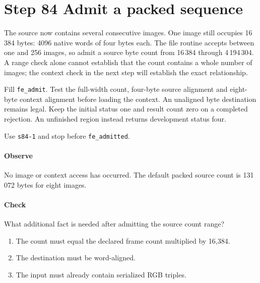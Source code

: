 \section{Step 84 Admit a packed sequence}
The source now contains several consecutive images. One image still occupies 16\,384 bytes: 4096 native words of four bytes each. The file routine accepts between one and 256 images, so admit a source byte count from 16\,384 through 4\,194\,304. A range check alone cannot establish that the count contains a whole number of images; the context check in the next step will establish the exact relationship.

Fill \texttt{fe\_admit}. Test the full-width count, four-byte source alignment and eight-byte context alignment before loading the context. An unaligned byte destination remains legal. Keep the initial status one and result count zero on a completed rejection. An unfinished region instead returns development status four.

Use \texttt{s84-1} and stop before \texttt{fe\_admitted}.

\paragraph{Observe} No image or context access has occurred. The default packed source count is 131\,072 bytes for eight images.

\paragraph{Check} What additional fact is needed after admitting the source count range?
\begin{enumerate}[label=\Alph*.]
  \item The count must equal the declared frame count multiplied by 16,384.
  \item The destination must be word-aligned.
  \item The input must already contain serialized RGB triples.
\end{enumerate}
